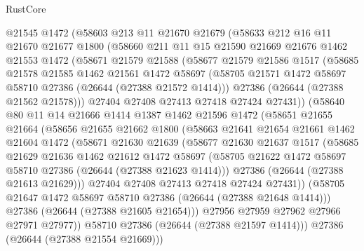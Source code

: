 \begin{lexlean}{RustCore}
\begin{coremodule}
    @21545
    @1472
    (@58603
      @213
      @11
      @21670
      @21679
      (@58633
        @212
        @16
        @11
        @21670
        @21677
        @1800
        (@58660
          @211
          @11
          @15
          @21590
          @21669
          @21676
          @1462
          @21553
          @1472
          (@58671
            @21579
            @21588
            (@58677
              @21579
              @21586
              @1517
              (@58685
                @21578
                @21585
                @1462
                @21561
                @1472
                @58697
                (@58705 @21571 @1472 @58697 @58710 @27386 (@26644 (@27388 @21572 @1414)))
                @27386
                (@26644 (@27388 @21562 @21578)))
              @27404
              @27408
              @27413
              @27418
              @27424
              @27431))
          (@58640
            @80
            @11
            @14
            @21666
            @1414
            @1387
            @1462
            @21596
            @1472
            (@58651
              @21655
              @21664
              (@58656
                @21655
                @21662
                @1800
                (@58663
                  @21641
                  @21654
                  @21661
                  @1462
                  @21604
                  @1472
                  (@58671
                    @21630
                    @21639
                    (@58677
                      @21630
                      @21637
                      @1517
                      (@58685
                        @21629
                        @21636
                        @1462
                        @21612
                        @1472
                        @58697
                        (@58705 @21622 @1472 @58697 @58710 @27386 (@26644 (@27388 @21623 @1414)))
                        @27386
                        (@26644 (@27388 @21613 @21629)))
                      @27404
                      @27408
                      @27413
                      @27418
                      @27424
                      @27431))
                  (@58705 @21647 @1472 @58697 @58710 @27386 (@26644 (@27388 @21648 @1414)))
                  @27386
                  (@26644 (@27388 @21605 @21654)))
                @27956
                @27959
                @27962
                @27966
                @27971
                @27977))
            @58710
            @27386
            (@26644 (@27388 @21597 @1414)))
          @27386
          (@26644 (@27388 @21554 @21669)))

\end{coremodule}
\end{lexlean}

